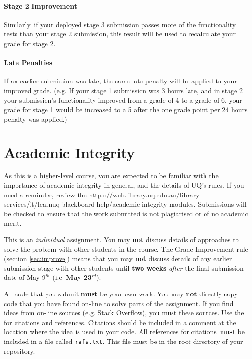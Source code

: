 \documentclass{csse4400}
\begin{document}
\paragraph{Stage 2 Improvement}
Similarly, if your deployed stage 3 submission passes more of the functionality tests than your stage 2 submission, this result will be used to recalculate your grade for stage 2.

\paragraph{Late Penalties}
If an earlier submission was late, the same late penalty will be applied to your improved grade.
(e.g. If your stage 1 submission was 3 hours late,
and in stage 2 your submission's functionality improved from a grade of 4 to a grade of 6,
your grade for stage 1 would be increased to a 5 after the one grade point per 24 hours penalty was applied.)


\section{Academic Integrity}
As this is a higher-level course, you are expected to be familiar with the importance of academic integrity in general,
and the details of UQ's rules.
If you need a reminder, review the 
{https://web.library.uq.edu.au/library-services/it/learnuq-blackboard-help/academic-integrity-modules}.
Submissions will be checked to ensure that the work submitted is not plagiarised or of no academic merit.

This is an \textit{individual} assignment.
You may \textbf{not} discuss details of approaches to solve the problem with other students in the course.
The Grade Improvement rule (section \ref{sec:improve}) means that
you may \textbf{not} discuss details of any earlier submission stage with other students
until \textbf{two weeks} \textit{after} the final submission date of May 9$^{th}$ (i.e. \textbf{May 23$^{rd}$}).

All code that you submit \textbf{must} be your own work.
You may \textbf{not} directly copy code that you have found on-line to solve parts of the assignment.
If you find ideas from on-line sources (e.g. Stack Overflow),
you must  these sources.
Use the 
for citations and references.
Citations should be included in a comment at the location where the idea is used in your code.
All references for citations \textbf{must} be included in a file called \texttt{refs.txt}.
This file must be in the root directory of your repository.
\end{document}
